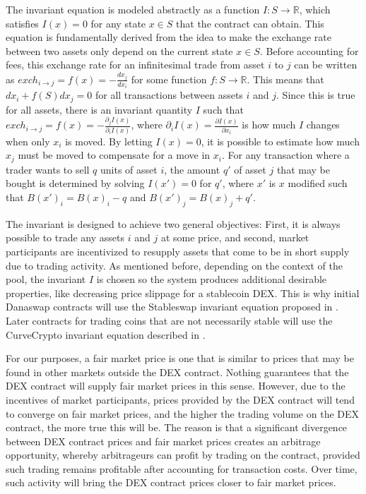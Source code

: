 \documentclass[12pt]{article}
\begin{document}
The invariant equation is modeled abstractly as a function $I : S \to
\mathbb{R}$, which satisfies $I(x) = 0$ for any state $x \in S$ that the
contract can obtain. This equation is fundamentally derived from the idea 
to make the exchange
rate between two assets only depend on the current state $x \in S$. Before
accounting for fees, this exchange rate for an infinitesimal trade from asset
$i$ to $j$ can be written as $exch_{i \rightarrow j} = f(x) =
-\frac{dx_j}{dx_i}$ for some function $f : S \to \mathbb{R}$. This means that
$dx_i + f(S) dx_j = 0$ for all transactions between assets $i$ and $j$. Since
this is true for all assets, there is an invariant quantity $I$ such that
$exch_{i \rightarrow j} = f(x) = -\frac{\partial_j I(x)}{\partial_i I(x)}$,
where $\partial_i I(x) = \frac{ \partial I(x)}{\partial x_i}$ is how much $I$
changes when only $x_i$ is moved. By letting $I(x) = 0$, it is possible to estimate
how much $x_j$ must be moved to compensate for a move in $x_i$.
For any transaction where a trader
wants to sell $q$ units of asset $i$, the amount $q'$ of asset $j$ that may be
bought is determined by solving $I(x') = 0$ for $q'$, where $x'$
is $x$ modified such that $B(x')_i = B(x)_i - q$ and $B(x')_j = B(x)_j + q'$.

The invariant is designed to achieve two general objectives: First, it is always possible to trade any assets $i$ and $j$ at some price, and second, market participants are incentivized to resupply assets that come to be in short supply due to trading activity. As mentioned before, depending on the context of the pool, the invariant $I$ is chosen so the system produces additional desirable properties, like decreasing price slippage for a stablecoin DEX. This is why initial Danaswap contracts will use the Stableswap invariant equation proposed in \cite{stableswap}. Later contracts for trading coins that are not necessarily stable will use the CurveCrypto invariant equation described in \cite{curvecrypto}.

For our purposes, a fair market price is one that is similar to prices that may be found in other markets outside the DEX contract. Nothing guarantees that the DEX contract will supply fair market prices in this sense. However, due to the incentives of market participants, prices provided by the DEX contract will tend to converge on fair market prices, and the higher the trading volume on the DEX contract, the more true this will be. The reason is that a significant divergence between DEX contract prices and fair market prices creates an arbitrage opportunity, whereby arbitrageurs can profit by trading on the contract, provided such trading remains profitable after accounting for transaction costs. Over time, such activity will bring the DEX contract prices closer to fair market prices. 
\end{document}

